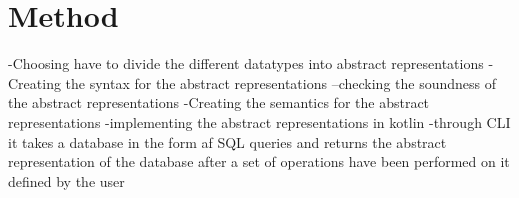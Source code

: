 \section{Method}
\label{sec:method}
-Choosing have to divide the different datatypes into abstract representations
-Creating the syntax for the abstract representations
--checking the soundness of the abstract representations
-Creating the semantics for the abstract representations
-implementing the abstract representations in kotlin
-through CLI it takes a database in the form af SQL queries and returns the abstract representation of the database after a set of operations have been performed on it defined by the user
